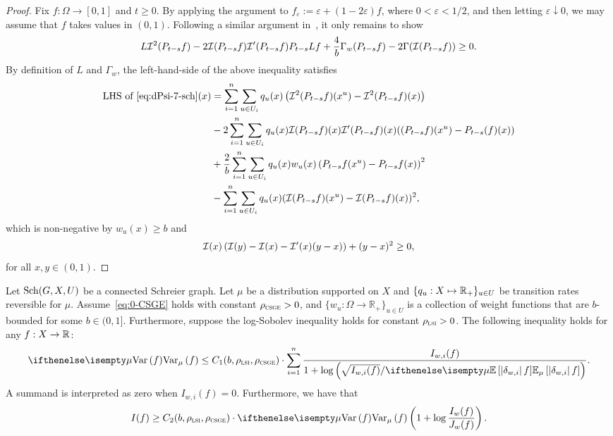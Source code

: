 \begin{proof}
    Fix $f : \Omega \to [0,1]$ and $t \ge 0$.
    By applying the argument to $f_\varepsilon:=\varepsilon+(1-2\varepsilon)f$, where $0<\varepsilon<1/2$, and then letting $\varepsilon\downarrow0$, we may assume that $f$ takes values in $(0,1)$.
    Following a similar argument in~, it only remains to show
    \begin{align}\label{eq:dPsi-7-sch}
        L \mathcal{I}^2(P_{t-s} f) - 2 \mathcal{I}(P_{t-s} f) \mathcal{I}'(P_{t-s} f) P_{t-s} L f+ \frac{4}{b}\Gamma_w(P_{t-s} f) - 2 \Gamma(\mathcal{I}(P_{t-s} f)) \ge 0.
    \end{align}
    By definition of $L$ and $\Gamma_w$, the left-hand-side of the above inequality satisfies
    \begin{align*}
    \text{LHS of~\eqref{eq:dPsi-7-sch}}(x) &= \sum_{i=1}^n \sum_{u \in U_i} q_u(x) \left(\mathcal{I}^2(P_{t-s} f)(x^u) - \mathcal{I}^2(P_{t-s} f)(x)\right)\\
    &- 2 \sum_{i=1}^n \sum_{u \in U_i} q_u(x) \mathcal{I}(P_{t-s} f)(x) \mathcal{I}'(P_{t-s} f)(x) ((P_{t-s} f)(x^u) - P_{t-s}(f)(x))\\
    &+ \frac{2}{b}\sum_{i=1}^n \sum_{u \in U_i} q_u(x) w_u(x) \left(P_{t-s} f(x^u) - P_{t-s} f(x)\right)^2\\
    &-\sum_{i=1}^n \sum_{u \in U_i} q_u(x) (\mathcal{I}(P_{t-s} f)(x^u) - \mathcal{I}(P_{t-s} f)(x))^2,
    \end{align*}
    which is non-negative by $w_u(x) \ge b$ and
    \begin{align*}
        \mathcal{I}(x)\left(\mathcal{I}(y) - \mathcal{I}(x) - \mathcal{I}'(x)(y-x)\right) + (y-x)^2 \ge 0,
    \end{align*}
    for all $x,y \in (0,1)$.
\end{proof}

\begin{theorem}\label{lem:l1_l2_talagrand_sch}
     Let $\mathrm{Sch}(G,X,U)$ be a connected Schreier graph.
     Let $\mu$ be a distribution supported on $X$ and $\{q_u: X \mapsto \mathbb{R}_+\}_{u \in U}$ be transition rates reversible for $\mu$.
    Assume~\eqref{eq:0-CSGE} holds with constant $\rho_{{\normalfont\textsc{csge}}} > 0$, and $\{w_u:\Omega \to \mathbb{R}_+\}_{u \in U}$ is a collection of weight functions that are $b$-bounded for some $b \in (0,1]$. Furthermore, suppose the log-Sobolev inequality holds for constant $\rho_{{\normalfont\textsc{lsi}}} > 0$.
    The following inequality holds for any $f:X \to \mathbb{R}$:
    \begin{align}\label{eq:l1_l2_talagrand_2_sch}
        \Var[\mu]{f} \leq C_1(b,\rho_{\LSI},\rho_{\CSGE}) \cdot \sum_{i=1}^n \frac{I_{w,i} (f)}{1 + \log\tp{\sqrt{I_{w,i}(f)} / \E[\mu]{\abs{\delta_{w,i}} f}}}.
    \end{align}
    A summand is interpreted as zero when $I_{w,i}(f)=0$.
    Furthermore, we have that
    \begin{align}\label{eq:l1_l2_talagrand_3_sch}
        I(f) \geq C_2(b,\rho_{\LSI},\rho_{\CSGE})\cdot \Var[\mu]{f}\tp{1 + \log \frac{I_w(f)}{J_w(f)}} .
    \end{align}
\end{theorem}

